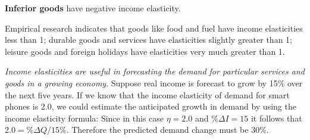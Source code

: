 \begin{DefBox}
\textbf{Inferior goods} have negative income elasticity.
\end{DefBox}

Empirical research indicates that goods like food and fuel have income
elasticities less than 1; durable goods and services have elasticities
slightly greater than 1; leisure goods and foreign holidays have
elasticities very much greater than 1.

\textit{Income elasticities are useful in forecasting the demand for
particular services and goods in a growing economy}. Suppose real income is
forecast to grow by 15\% over the next five years. If we know that the
income elasticity of demand for smart phones is 2.0, we could estimate the
anticipated growth in demand by using the income elasticity formula: Since
in this case $\eta=2.0$ and $\%\Delta I=15$ it follows that $2.0=\%\Delta
Q/15\%$. Therefore the predicted demand change must be 30\%.
